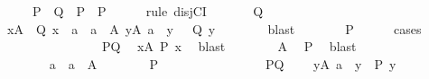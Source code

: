\begin{isabellebody}
\ \ \ \ {\isacharparenleft}{\kern0pt}\ {\isachardoublequoteopen}{\isacharquery}{\kern0pt}P\ {\isasymor}\ {\isacharquery}{\kern0pt}Q{\isachardoublequoteclose}\ \ {\isachardoublequoteopen}{\isacharquery}{\kern0pt}P{}\ {\isasymand}\ {\isacharquery}{\kern0pt}P{}\ {\isasymor}\ {\isacharunderscore}{\kern0pt}{\isachardoublequoteclose}{\isacharparenright}{\kern0pt}\isanewline
\ \ \isamarkupfalse%
\ {\isacharparenleft}{\kern0pt}rule\ disjCI{\isacharparenright}{\kern0pt}\isanewline
\ \ \ \ \isamarkupfalse%
\ {\isachardoublequoteopen}{\isasymnot}\ {\isacharquery}{\kern0pt}Q{\isachardoublequoteclose}\isanewline
\ \ \ \ \isamarkupfalse%
\ \isamarkupfalse%
\ {\isachardoublequoteopen}{\isasymforall}x{\isasymin}A{\isachardot}{\kern0pt}\ {\isasymnot}\ Q\ x{\isachardoublequoteclose}\ {\isacharbar}{\kern0pt}\ a\ \ {\isachardoublequoteopen}a\ {\isasymin}\ A{\isachardoublequoteclose}\ {\isachardoublequoteopen}{\isasymforall}y{\isasymin}A{\isachardot}{\kern0pt}\ a\ {\isasymle}\ y\ {\isasymlongrightarrow}\ {\isasymnot}\ Q\ y{\isachardoublequoteclose}\isanewline
\ \ \ \ \ \ \isamarkupfalse%
\ blast\isanewline
\ \ \ \ \isamarkupfalse%
\ \isamarkupfalse%
\ {\isacharquery}{\kern0pt}P\isanewline
\ \ \ \ \isamarkupfalse%
\ cases\isanewline
\ \ \ \ \ \ \isamarkupfalse%
\ {}\isanewline
\ \ \ \ \ \ \isamarkupfalse%
\ P{\isacharunderscore}{\kern0pt}Q\ \isamarkupfalse%
\ {\isachardoublequoteopen}{\isasymforall}x{\isasymin}A{\isachardot}{\kern0pt}\ P\ x{\isachardoublequoteclose}\ \isamarkupfalse%
\ blast\isanewline
\ \ \ \ \ \ \isamarkupfalse%
\ A\ \isamarkupfalse%
\ {\isacharquery}{\kern0pt}P\ \isamarkupfalse%
\ blast\isanewline
\ \ \ \ \isamarkupfalse%
\isanewline
\ \ \ \ \ \ \isamarkupfalse%
\ {}\isanewline
\ \ \ \ \ \ \isamarkupfalse%
\ a\ {\isacharequal}{\kern0pt}\ {\isacartoucheopen}a\ {\isasymin}\ A{\isacartoucheclose}\isanewline
\ \ \ \ \ \ \isamarkupfalse%
\ {\isacharquery}{\kern0pt}P\isanewline
\ \ \ \ \ \ \isamarkupfalse%
\isanewline
\ \ \ \ \ \ \ \ \isamarkupfalse%
\ P{\isacharunderscore}{\kern0pt}Q\ {}\ \isamarkupfalse%
\ {\isacharasterisk}{\kern0pt}{\isacharcolon}{\kern0pt}\ {\isachardoublequoteopen}{\isasymforall}y{\isasymin}A{\isachardot}{\kern0pt}\ a\ {\isasymle}\ y\ {\isasymlongrightarrow}\ P\ y{\isachardoublequoteclose}\ \isamarkupfalse%

\end{isabellebody}
